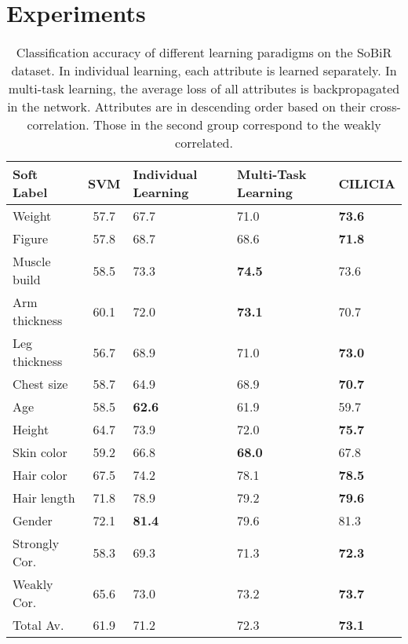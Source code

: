 \documentclass[10pt,twocolumn,letterpaper]{article}
\begin{document}
	
	\section{Experiments}    
	
	\begin{table}[t]
		\centering
		\caption{Classification accuracy of different learning paradigms on the SoBiR dataset. In individual learning, each attribute is learned separately. In multi-task learning, the average loss of all attributes is backpropagated in the network. Attributes are in descending order based on their cross-correlation. Those in the second group correspond to the weakly correlated.}
		\small    
		\begin{tabular}{l c P{1.2cm} P{1.4cm} P{1.2cm}}
			\toprule
			Soft Label  & SVM & Individual Learning & Multi-Task Learning & CILICIA\\
			\midrule
			Weight & 57.7 & 67.7 & 71.0 & \textbf{73.6} \\
			Figure &  57.8 & 68.7 & 68.6 & \textbf{71.8}  \\
			Muscle build & 58.5 & 73.3 & \textbf{74.5} & 73.6 \\
			Arm thickness & 60.1 & 72.0 & \textbf{73.1} & 70.7 \\
			Leg thickness & 56.7 & 68.9 & 71.0 & \textbf{73.0} \\
			Chest size &  58.7 & 64.9 & 68.9 & \textbf{70.7} \\
			\midrule
			Age &  58.5 & \textbf{62.6} & 61.9 & 59.7 \\
			Height &  64.7 & 73.9 & 72.0 & \textbf{75.7} \\            
			Skin color & 59.2 & 66.8 & \textbf{68.0} & 67.8 \\
			Hair color &  67.5 & 74.2 & 78.1 & \textbf{78.5} \\
			Hair length & 71.8 & 78.9 & 79.2 & \textbf{79.6} \\
			Gender & 72.1 & \textbf{81.4} & 79.6 & 81.3 \\
			\midrule
			Strongly Cor.& 58.3 & 69.3 & 71.3 & \textbf{72.3} \\
			Weakly Cor.& 65.6 & 73.0 & 73.2 & \textbf{73.7} \\
			Total Av. &  61.9 & 71.2 & 72.3 & \textbf{73.1}\\
			\bottomrule
		\end{tabular}%
		\label{tab:SoBiR}%
	\end{table}%
\end{document}
